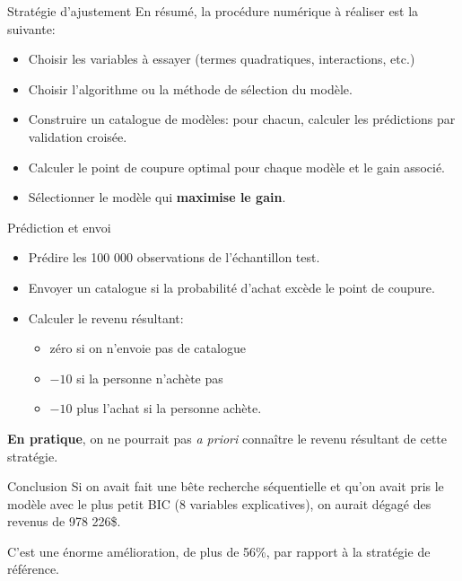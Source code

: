 \documentclass[
  ignorenonframetext,
]{beamer}
\providecommand{\tightlist}{%
  \setlength{\itemsep}{0pt}\setlength{\parskip}{0pt}}\usepackage{longtable,booktabs,array}
\begin{document}
\begin{frame}{Stratégie d'ajustement}
\protect\hypertarget{stratuxe9gie-dajustement}{}
En résumé, la procédure numérique à réaliser est la suivante:

\begin{itemize}
\tightlist
\item
  Choisir les variables à essayer (termes quadratiques, interactions,
  etc.)
\item
  Choisir l'algorithme ou la méthode de sélection du modèle.
\item
  Construire un catalogue de modèles: pour chacun, calculer les
  prédictions par validation croisée.
\item
  Calculer le point de coupure optimal pour chaque modèle et le gain
  associé.
\item
  Sélectionner le modèle qui \textbf{maximise le gain}.
\end{itemize}
\end{frame}

\begin{frame}{Prédiction et envoi}
\protect\hypertarget{pruxe9diction-et-envoi}{}
\begin{itemize}
\tightlist
\item
  Prédire les 100 000 observations de l'échantillon test.
\item
  Envoyer un catalogue si la probabilité d'achat excède le point de
  coupure.
\item
  Calculer le revenu résultant:

  \begin{itemize}
  \tightlist
  \item
    zéro si on n'envoie pas de catalogue
  \item
    \(-10\) si la personne n'achète pas
  \item
    \(-10\) plus l'achat si la personne achète.
  \end{itemize}
\end{itemize}

\textbf{En pratique}, on ne pourrait pas \emph{a priori} connaître le
revenu résultant de cette stratégie.
\end{frame}

\begin{frame}{Conclusion}
\protect\hypertarget{conclusion}{}
Si on avait fait une bête recherche séquentielle et qu'on avait pris le
modèle avec le plus petit BIC (8 variables explicatives), on aurait
dégagé des revenus de 978 226\$.

C'est une énorme amélioration, de plus de 56\%, par rapport à la
stratégie de référence.
\end{frame}
\end{document}
